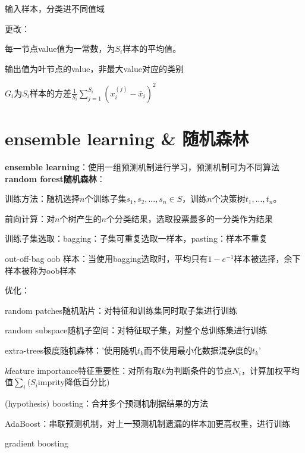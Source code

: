 \documentclass[UTF8]{ctexart}
\begin{document}
  输入样本，分类进不同值域

  更改：
  
  \quad 每一节点value值为一常数，为$S_i$样本的平均值。
  
  \quad 输出值为叶节点的value，非最大value对应的类别

  \quad $G_i$为$S_i$样本的方差$\frac{1}{S_i}\sum_{j=1}^{S_i}(x_i^{(j)} - \bar{x}_i)^2$

\section{ensemble learning \& 随机森林}
\noindent \textbf{ensemble learning}：使用一组预测机制进行学习，预测机制可为不同算法\\
\textbf{random forest随机森林}：

  训练方法：随机选择$n$个训练子集$s_1, s_2, ..., s_n \in S$，训练$n$个决策树$t_1, ..., t_n$。
  
  前向计算：对$n$个树产生的$n$个分类结果，选取投票最多的一分类作为结果
  
  训练子集选取：bagging：子集可重复选取一样本，pasting：样本不重复
  
  \quad out-off-bag oob 样本：当使用bagging选取时，平均只有$1-e^{-1}$样本被选择，余下样本被称为oob样本

  优化：

  \quad random patches随机贴片：对特征和训练集同时取子集进行训练
  
  \quad random subspace随机子空间：对特征取子集，对整个总训练集进行训练
  
  \quad extra-trees极度随机森林：'使用随机$t_k$而不使用最小化数据混杂度的$t_k$'
  
  \quad $k$feature importance特征重要性：对所有取$k$为判断条件的节点$N_i$，计算加权平均值$\sum_i(S_i$imprity降低百分比$)$
  
  \quad (hypothesis) boosting：合并多个预测机制据结果的方法
  
  \quad \quad AdaBoost：串联预测机制，对上一预测机制遗漏的样本加更高权重，进行训练

  \quad \quad gradient boosting


\end{document}
